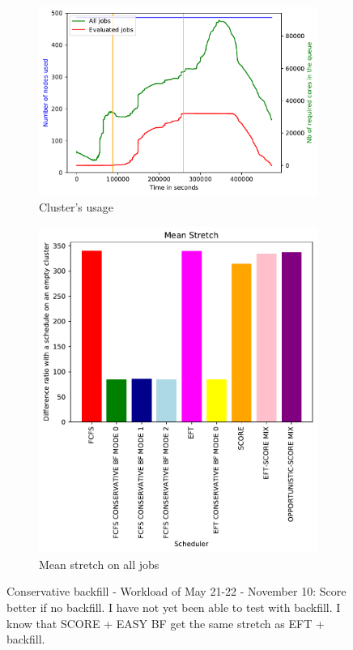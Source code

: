 \documentclass[a4paper]{article}
\begin{document}
\begin{figure}[H]\centering
\begin{subfigure}[b]{0.4\linewidth}\centering\includegraphics[width=1\linewidth]{MBSS/plot/2022-05-21->2022-05-22_V9271_Fcfs_Used_nodes_450_128_32_256_4_1024.pdf}\caption{Cluster's usage}\end{subfigure}
\begin{subfigure}[b]{0.4\linewidth}\centering\includegraphics[width=0.9\linewidth]{MBSS/plot/Results_FCFS_Score_Backfill_2022-05-21->2022-05-22_V9271_Mean_Stretch_450_128_32_256_4_1024.pdf}\caption{Mean stretch on all jobs}\end{subfigure}
\caption{Conservative backfill - Workload of May 21-22 - November 10: Score better if no backfill. I have not yet been able to test with backfill. I know that SCORE + EASY BF get the same stretch as EFT + backfill.}\end{figure}
\end{document}
